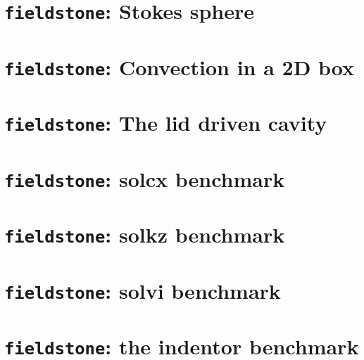\documentclass[a4paper]{article}
\begin{document}
\newpage
\section{{\tt fieldstone}: Stokes sphere }


\newpage
\section{{\tt fieldstone}: Convection in a 2D box}


\newpage
\section{{\tt fieldstone}: The lid driven cavity}



\newpage
\section{{\tt fieldstone}: solcx benchmark}


\newpage
\section{{\tt fieldstone}: solkz benchmark}


\newpage
\section{{\tt fieldstone}: solvi benchmark}


\newpage
\section{{\tt fieldstone}: the indentor benchmark}

\end{document}
